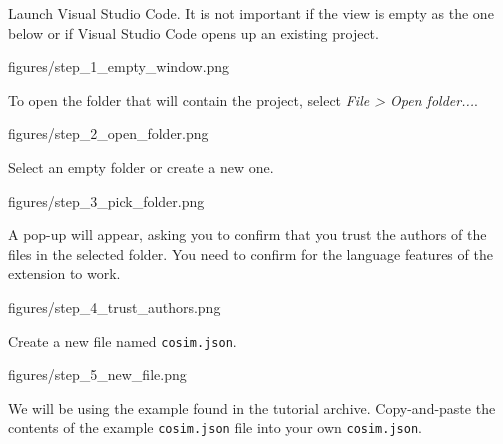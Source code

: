 \documentclass[11pt,a4paper]{../tutorial}
\begin{document}
\begin{instructions} 

\item Launch Visual Studio Code. It is not important if the view is empty as the one below or if Visual Studio Code opens up an existing project.
	
	\begin{annotation}[width=0.9\linewidth]{figures/step_1_empty_window.png}
	\end{annotation}

\item To open the folder that will contain the project, select \textit{File \textgreater{} Open folder...}.
	
	\begin{annotation}[width=0.9\linewidth]{figures/step_2_open_folder.png}
	\end{annotation}

\item Select an empty folder or create a new one.
	
	\begin{annotation}[width=0.9\linewidth]{figures/step_3_pick_folder.png}
	\end{annotation}

\newpage
\item A pop-up will appear, asking you to confirm that you trust the authors of the files in the selected folder. You need to confirm for the language features of the extension to work.
	
	\begin{annotation}[width=0.9\linewidth]{figures/step_4_trust_authors.png}
	\end{annotation}

\item Create a new file named \texttt{cosim.json}.
	
	\begin{annotation}[width=0.9\linewidth]{figures/step_5_new_file.png}
	\end{annotation}

\item We will be using the example found in the tutorial archive. Copy-and-paste the contents of the example \texttt{cosim.json} file into your own \texttt{cosim.json}.


\end{instructions}
\end{document}
